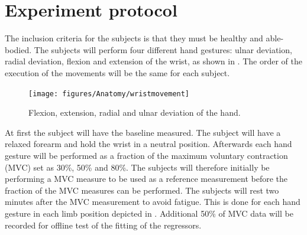 \section{Experiment protocol} \label{sec:protocol}

The inclusion criteria for the subjects is that they must be healthy and able-bodied. The subjects will perform four different hand gestures: ulnar deviation, radial deviation, flexion and extension of the wrist, as shown in . The order of the execution of the movements will be the same for each subject.

\begin{figure}[H]
	\texttt{[image: figures/Anatomy/wristmovement]}  %
	\caption{Flexion, extension, radial and ulnar deviation of the hand.}
	\label{fig:handgest}  %
\end{figure}

At first the subject will have the baseline measured. The subject will have a relaxed forearm and hold the wrist in a neutral position. Afterwards each hand gesture will be performed as a fraction of the maximum voluntary contraction (MVC) set as 30\%, 50\% and 80\%. The subjects will therefore initially be performing a MVC measure to be used as a reference measurement before the fraction of the MVC measures can be performed. The subjects will rest two minutes after the MVC measurement to avoid fatigue. This is done for each hand gesture in each limb position depicted in . Additional 50\% of MVC data will be recorded for offline test of the fitting of the regressors.

